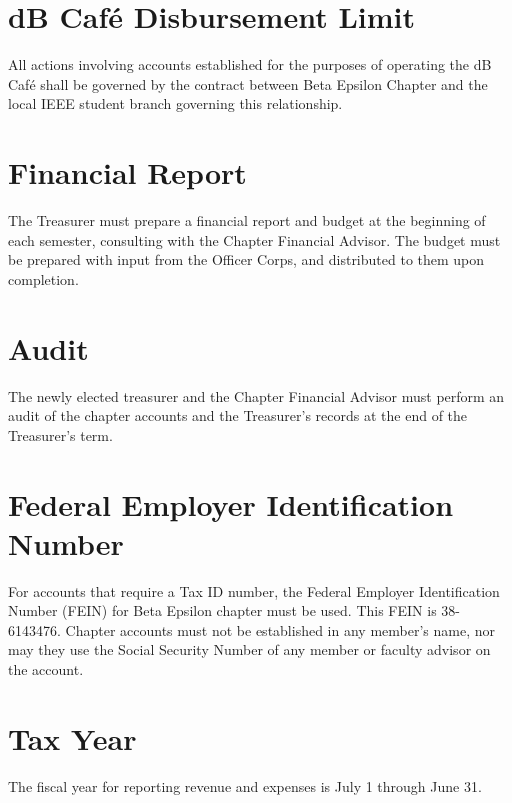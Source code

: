 \section{dB Caf\'{e} Disbursement Limit}
All actions involving accounts established for the purposes of operating the dB Caf\'{e} shall be governed by the contract between \hkn Beta Epsilon Chapter and the local IEEE student branch governing this relationship.

\section{Financial Report}
The Treasurer must prepare a financial report and budget at the beginning of each semester, consulting with the Chapter Financial Advisor. The budget must be prepared with input from the Officer Corps, and distributed to them upon completion.

\section{Audit}
The newly elected treasurer and the Chapter Financial Advisor must perform an audit of the chapter accounts and the Treasurer's records at the end of the Treasurer's term.

\section{Federal Employer Identification Number}
For accounts that require a Tax ID number, the Federal Employer Identification Number (FEIN) for Beta Epsilon chapter must be used. This FEIN is 38-6143476. Chapter accounts must not be established in any member's name, nor may they use the Social Security Number of any member or faculty advisor on the account.

\section{Tax Year}
The fiscal year for reporting revenue and expenses is July 1 through June 31.

